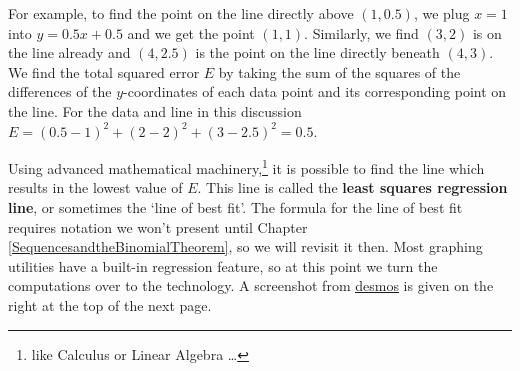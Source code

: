 \documentclass{ximera}
\begin{document}
For example, to find the point on the line directly above $(1,0.5)$, we plug $x=1$ into $y=0.5x + 0.5$ and we get the point $(1,1)$.  Similarly, we find $(3,2)$ is on the line already and $(4,2.5)$ is the point on the line directly beneath $(4,3)$.   We find the total squared error $E$ by taking the sum of the squares of the differences of the $y$-coordinates of each data point and its corresponding point on the line. For the data and line in this discussion $E = (0.5-1)^2+(2-2)^2+\left(3-2.5\right)^2 = 0.5$.  



Using advanced mathematical machinery,\footnote{like Calculus or Linear Algebra \ldots} it is possible to find the line which results in the lowest value of $E$.  This line is called the \textbf{least squares regression line}, or sometimes the `line of best fit'.  The formula for the line of best fit requires notation we won't present until Chapter \ref{SequencesandtheBinomialTheorem}, so we will revisit it then.  Most graphing utilities have a built-in regression feature, so at this point we turn the computations over to the technology.  A screenshot from \href{www.desmos.com}{\underline{desmos}} is given on the right at the top of the next page.  





\begin{center}


\end{center}
\end{document}
